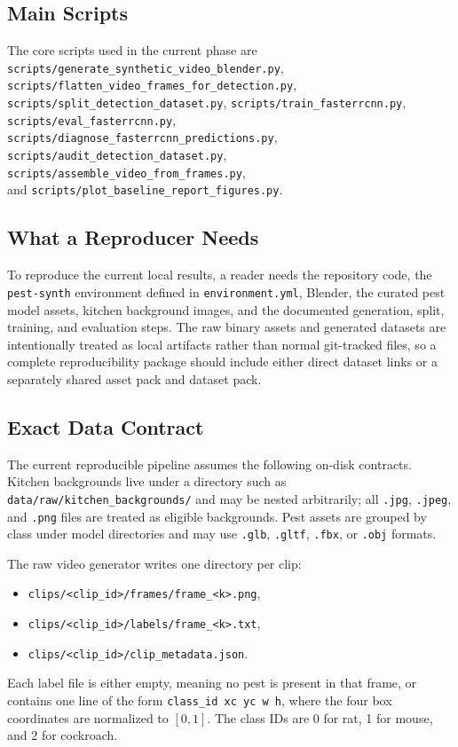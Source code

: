 \documentclass[11pt]{article}
\begin{document}
\subsection{Main Scripts}
The core scripts used in the current phase are \texttt{scripts/generate\_synthetic\_video\_blender.py}, \\\texttt{scripts/flatten\_video\_frames\_for\_detection.py}, \\\texttt{scripts/split\_detection\_dataset.py}, \texttt{scripts/train\_fasterrcnn.py}, \\\texttt{scripts/eval\_fasterrcnn.py}, \\\texttt{scripts/diagnose\_fasterrcnn\_predictions.py}, \\\texttt{scripts/audit\_detection\_dataset.py}, \\\texttt{scripts/assemble\_video\_from\_frames.py},\\ and \texttt{scripts/plot\_baseline\_report\_figures.py}.

\subsection{What a Reproducer Needs}
To reproduce the current local results, a reader needs the repository code, the \texttt{pest-synth} environment defined in \texttt{environment.yml}, Blender, the curated pest model assets, kitchen background images, and the documented generation, split, training, and evaluation steps. The raw binary assets and generated datasets are intentionally treated as local artifacts rather than normal git-tracked files, so a complete reproducibility package should include either direct dataset links or a separately shared asset pack and dataset pack.

\subsection{Exact Data Contract}
The current reproducible pipeline assumes the following on-disk contracts. Kitchen backgrounds live under a directory such as \texttt{data/raw/kitchen\_backgrounds/} and may be nested arbitrarily; all \texttt{.jpg}, \texttt{.jpeg}, and \texttt{.png} files are treated as eligible backgrounds. Pest assets are grouped by class under model directories and may use \texttt{.glb}, \texttt{.gltf}, \texttt{.fbx}, or \texttt{.obj} formats.

The raw video generator writes one directory per clip:
\begin{itemize}[leftmargin=1.5em]
    \item \texttt{clips/<clip\_id>/frames/frame\_<k>.png},
    \item \texttt{clips/<clip\_id>/labels/frame\_<k>.txt},
    \item \texttt{clips/<clip\_id>/clip\_metadata.json}.
\end{itemize}
Each label file is either empty, meaning no pest is present in that frame, or contains one line of the form \texttt{class\_id xc yc w h}, where the four box coordinates are normalized to $[0,1]$. The class IDs are 0 for rat, 1 for mouse, and 2 for cockroach.
\end{document}
